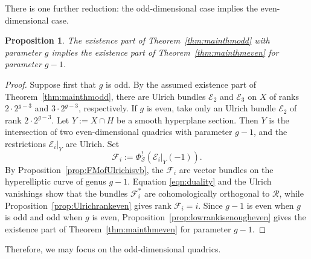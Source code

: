 \documentclass[12pt, letterpaper]{amsart}
\newtheorem{proposition}[theorem]{Proposition}
\theoremstyle{definition}
\newcommand{\cE}{\mathcal{E} }
\newcommand{\cF}{\mathcal{F} }
\newcommand{\cR}{\mathcal{R} }
\newcommand{\cS}{\mathcal{S} }
\def\rank{\mathrm{rank}\;}
\begin{document}
There is one further reduction: the odd-dimensional case implies the even-dimensional case.

\begin{proposition}\label{prop:oddimplieseven}
The existence part of Theorem~\ref{thm:mainthmodd} with parameter \(g\) implies the existence part of Theorem~\ref{thm:mainthmeven} for parameter \(g -1\).
\end{proposition}

\begin{proof}
Suppose first that \(g\) is odd. By the assumed existence part of Theorem~\ref{thm:mainthmodd}, there are Ulrich bundles \(\cE_2\) and \(\cE_3\) on \(X\) of ranks \(2\cdot 2^{g-3}\) and \(3\cdot 2^{g-3}\), respectively. If \(g\) is even, take only an Ulrich bundle \(\cE_2\) of rank \(2\cdot 2^{g-3}\). Let \(Y:=X\cap H\) be a smooth hyperplane section. Then \(Y\) is the intersection of two even-dimensional quadrics with parameter \(g-1\), and the restrictions \(\cE_i|_Y\) are Ulrich. Set
\[\cF_i:=\Phi_{\cS}^!(\cE_i|_Y(-1)).\]
By Proposition~\ref{prop:FMofUlrichisvb}, the \(\cF_i\) are vector bundles on the hyperelliptic curve of genus \(g-1\). Equation \eqref{eqn:duality} and the Ulrich vanishings show that the bundles \(\cF_i^*\) are cohomologically orthogonal to \(\cR\), while Proposition~\ref{prop:Ulrichrankeven} gives \(\rank\cF_i=i\). Since \(g-1\) is even when \(g\) is odd and odd when \(g\) is even, Proposition~\ref{prop:lowrankisenougheven} gives the existence part of Theorem~\ref{thm:mainthmeven} for parameter \(g-1\).
\end{proof}

Therefore, we may focus on the odd-dimensional quadrics.
\end{document}
